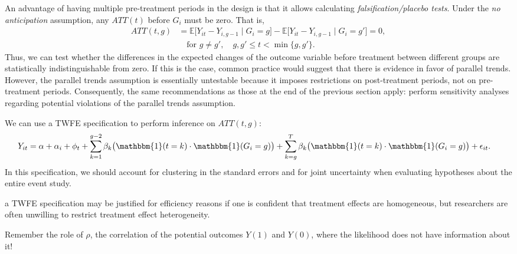 An advantage of having multiple pre-treatment periods in the design is that it allows calculating \textit{falsification/placebo tests}. Under the \textit{no anticipation} assumption, any $ATT(t)$ before $G_i$ must be zero. That is, 
\begin{align*}
	ATT(t,g) 
	&= \mathbb{E}\big[ Y_{it} - Y_{i, g-1} \mid G_i = g \big]
	- \mathbb{E}\big[ Y_{it} - Y_{i, g-1} \mid G_i = g' \big] = 0, \\
	&\quad \text{for } g \neq g', \quad g, g' \leq t < \min\{g, g'\}.
\end{align*}
Thus, we can test whether the differences in the expected changes of the outcome variable before treatment between different groups are statistically indistinguishable from zero. If this is the case, common practice would suggest that there is evidence in favor of parallel trends. However, the parallel trends assumption is essentially untestable because it imposes restrictions on post-treatment periods, not on pre-treatment periods. Consequently, the same recommendations as those at the end of the previous section apply: perform sensitivity analyses regarding potential violations of the parallel trends assumption.

We can use a TWFE specification to perform inference on $ATT(t,g)$:
\begin{align*}
	Y_{it} &= \alpha + \alpha_i + \phi_t 
	+ \sum_{k=1}^{g-2} \beta_k \big( \mathbbm{1}(t=k) \cdot \mathbbm{1}(G_i=g) \big) 
	+ \sum_{k=g}^{T} \beta_k \big( \mathbbm{1}(t=k) \cdot \mathbbm{1}(G_i=g) \big) 
	+ \epsilon_{it}.
\end{align*}
In this specification, we should account for clustering in the standard errors and for joint uncertainty when evaluating hypotheses about the entire event study.

 


a TWFE specification may be justified for efficiency reasons if one is confident that treatment effects are homogeneous, but researchers are often unwilling to restrict treatment effect heterogeneity.


Remember the role of $\rho$, the correlation of the potential outcomes $Y(1)$ and $Y(0)$, where the likelihood does not have information about it!









